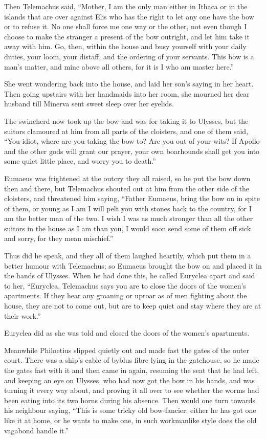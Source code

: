 Then Telemachus said, “Mother, I am the only man either in Ithaca or in the
islands that are over against Elis who has the right to let any one have the
bow or to refuse it. No one shall force me one way or the other, not even
though I choose to make the stranger a present of the bow outright, and let him
take it away with him. Go, then, within the house and busy yourself with your
daily duties, your loom, your distaff, and the ordering of your servants. This
bow is a man’s matter, and mine above all others, for it is I who am master
here.”

She went wondering back into the house, and laid her son’s saying in her heart.
Then going upstairs with her handmaids into her room, she mourned her dear
husband till Minerva sent sweet sleep over her eyelids.

The swineherd now took up the bow and was for taking it to Ulysses, but the
suitors clamoured at him from all parts of the cloisters, and one of them said,
“You idiot, where are you taking the bow to? Are you out of your wits? If
Apollo and the other gods will grant our prayer, your own boarhounds shall get
you into some quiet little place, and worry you to death.”

Eumaeus was frightened at the outcry they all raised, so he put the bow down
then and there, but Telemachus shouted out at him from the other side of the
cloisters, and threatened him saying, “Father Eumaeus, bring the bow on in
spite of them, or young as I am I will pelt you with stones back to the
country, for I am the better man of the two. I wish I was as much stronger than
all the other suitors in the house as I am than you, I would soon send some of
them off sick and sorry, for they mean mischief.”

Thus did he speak, and they all of them laughed heartily, which put them in a
better humour with Telemachus; so Eumaeus brought the bow on and placed it in
the hands of Ulysses. When he had done this, he called Euryclea apart and said
to her, “Euryclea, Telemachus says you are to close the doors of the women’s
apartments. If they hear any groaning or uproar as of men fighting about the
house, they are not to come out, but are to keep quiet and stay where they are
at their work.”

Euryclea did as she was told and closed the doors of the women’s apartments.

Meanwhile Philoetius slipped quietly out and made fast the gates of the outer
court. There was a ship’s cable of byblus fibre lying in the gatehouse, so he
made the gates fast with it and then came in again, resuming the seat that he
had left, and keeping an eye on Ulysses, who had now got the bow in his hands,
and was turning it every way about, and proving it all over to see whether the
worms had been eating into its two horns during his absence. Then would one
turn towards his neighbour saying, “This is some tricky old bow-fancier; either
he has got one like it at home, or he wants to make one, in such workmanlike
style does the old vagabond handle it.”

